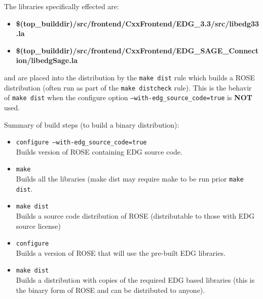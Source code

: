The libraries specifically effected are:
\begin{itemize}
   \item {\bf \$(top_builddir)/src/frontend/CxxFrontend/EDG_3.3/src/libedg33.la}
   \item {\bf \$(top_builddir)/src/frontend/CxxFrontend/EDG_SAGE_Connection/libedgSage.la}
\end{itemize}
and are placed into the distribution by the {\tt make dist} rule which builds a ROSE distribution
(often run as part of the {\tt make distcheck} rule).  This is the behavir of {\tt make dist}
when the configure option {\tt --with-edg_source_code=true} is {\bf NOT} used.

Summary of build steps (to build a binary distribution):
\begin{itemize}
   \item {\tt configure --with-edg_source_code=true} \\
          Builds version of ROSE containing EDG source code.
   \item  {\tt make} \\
          Builds all the libraries (make dist may require make to be run prior {\tt make dist}.
   \item  {\tt make dist} \\
          Builds a source code distribution of ROSE (distributable to those with EDG source license)
   \item {\tt configure} \\
          Builds a version of ROSE that will use the pre-built EDG libraries.
   \item {\tt make dist} \\
          Builds a distribution with copies of the required EDG based libraries
          (this is the binary form of ROSE and can be distributed to anyone).
\end{itemize}


